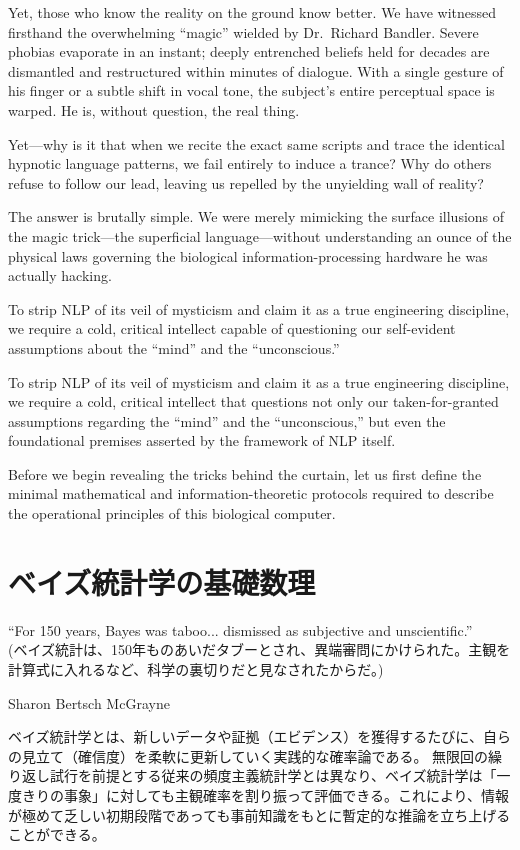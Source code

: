     Yet, those who know the reality on the ground know better.
    We have witnessed firsthand the overwhelming ``magic'' wielded by Dr.~Richard Bandler. Severe phobias evaporate in an instant; deeply entrenched beliefs held for decades are dismantled and restructured within minutes of dialogue. With a single gesture of his finger or a subtle shift in vocal tone, the subject's entire perceptual space is warped. He is, without question, the real thing.

    Yet—why is it that when we recite the exact same scripts and trace the identical hypnotic language patterns, we fail entirely to induce a trance? Why do others refuse to follow our lead, leaving us repelled by the unyielding wall of reality?

    The answer is brutally simple.
    We were merely mimicking the surface illusions of the magic trick—the superficial language—without understanding an ounce of the physical laws governing the biological information-processing hardware he was actually hacking.

    To strip NLP of its veil of mysticism and claim it as a true engineering discipline, we require a cold, critical intellect capable of questioning our self-evident assumptions about the ``mind'' and the ``unconscious.''

    To strip NLP of its veil of mysticism and claim it as a true engineering discipline, we require a cold, critical intellect that questions not only our taken-for-granted assumptions regarding the ``mind'' and the ``unconscious,'' but even the foundational premises asserted by the framework of NLP itself.

    Before we begin revealing the tricks behind the curtain, let us first define the minimal mathematical and information-theoretic protocols required to describe the operational principles of this biological computer.
\fi

\section{ベイズ統計学の基礎数理}
\epigraph{``For 150 years, Bayes was taboo... dismissed as subjective and unscientific.''\\(ベイズ統計は、150年ものあいだタブーとされ、異端審問にかけられた。主観を計算式に入れるなど、科学の裏切りだと見なされたからだ。)}{Sharon Bertsch McGrayne}
ベイズ統計学とは、新しいデータや証拠（エビデンス）を獲得するたびに、自らの見立て（確信度）を柔軟に更新していく実践的な確率論である。
無限回の繰り返し試行を前提とする従来の頻度主義統計学とは異なり、ベイズ統計学は「一度きりの事象」に対しても主観確率を割り振って評価できる。これにより、情報が極めて乏しい初期段階であっても事前知識をもとに暫定的な推論を立ち上げることができる。

